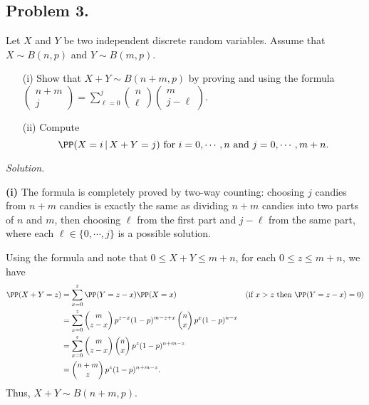 \subsection*{Problem 3.} Let $X$ and $Y$ be two independent discrete random variables. Assume that $X\sim B(n, p)$ and $Y\sim B(m, p)$.
\begin{enumerate}
    \item [(i)] Show that $X+Y\sim B(n+m,p)$ by proving and using the formula $\begin{pmatrix}
        n+m\\j
\end{pmatrix}=\sum\limits_{\ell=0}^{j} \begin{pmatrix}
        n\\\ell
\end{pmatrix}\begin{pmatrix}
        m\\j-\ell
\end{pmatrix}.$
    \item [(ii)] Compute
$$\PP(X = i\,|\,X + Y = j) \text{ for } i = 0,\cdots,n \text{ and } j = 0,\cdots,m + n.$$
\end{enumerate}

\textit{Solution.}

\textbf{(i)} The formula is completely proved by two-way counting: choosing $j$ candies from $n+m$ candies is exactly the same as dividing $n+m$ candies into two parts of $n$ and $m$, then choosing $\ell$ from the first part and $j-\ell$ from the same part, where each $\ell\in\{0,\cdots,j\}$ is a possible solution.

Using the formula and note that $0\le X+Y\le m+n$, for each $0\le z\le m+n$, we have
\begin{align*}
\PP(X+Y=z) 
&= \sum\limits_{x=0}^z \PP(Y=z-x)\PP(X=x) & \text{(if $x>z$ then $\PP(Y=z-x)=0$)}\\
&= \sum\limits_{x=0}^z\begin{pmatrix}
    m\\z-x
\end{pmatrix}p^{z-x}(1-p)^{m-z+x}\begin{pmatrix}
    n\\ x
\end{pmatrix}  p^{x}(1-p)^{n-x}\\
&=\sum\limits_{x=0}^z\begin{pmatrix}
    m\\z-x
\end{pmatrix} \begin{pmatrix}
    n\\ x
\end{pmatrix} p^z(1-p)^{n+m-z}\\
&=\begin{pmatrix}
    n+m\\z
\end{pmatrix} p^{z}(1-p)^{n+m-z}.
\end{align*}
Thus, $X+Y\sim B(n+m,p)$.


